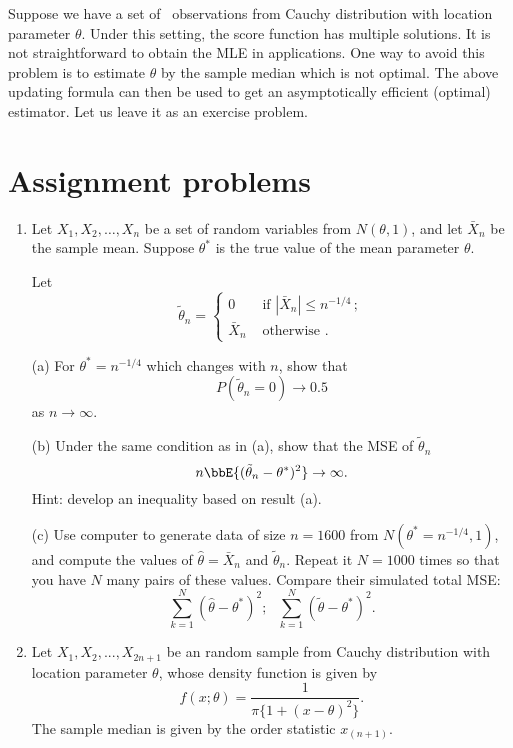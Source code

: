 Suppose we have a set of \iid\ observations from Cauchy distribution
with location parameter $\theta$. Under this setting, the score function
has multiple solutions. It is not straightforward to obtain the MLE in
applications. One way to avoid this problem is to estimate $\theta$ by
the sample median which is not optimal. 
The above updating formula can then be used
to get an asymptotically efficient (optimal) estimator.
Let us leave it as an exercise problem.

\section{Assignment problems}
\begin{enumerate}

\item
Let $ X_{1}, X_{2}, \ldots, X_{n} $ be a set of \iid random
variables from 
$ N( \theta, 1 ) $, and let $ \bar X_{n} $ be the sample mean. 
Suppose $ \theta^{*} $ is the true value of the mean parameter $ \theta $. 

Let 
\[ 
\tilde \theta_{n} = 
\begin{cases} 
0 & \text { if } | \bar X_{n} | \leq n^{ - 1/4 } \, ; \\ 
\bar X_{n} & \text { otherwise }. 
\end{cases} 
\]  

(a)
For $ \theta^{*} = n^{ - 1/4 } $ which changes with $n$, show that
\[
P( \tilde \theta_n = 0 ) \to 0.5
\]
as $n \to \infty$.

(b)
Under the same condition as in (a), show that the MSE of $\tilde \theta_n$
\[
n \bbE\{ (\tilde \theta_n - \theta^*)^2 \}
\to \infty.
\]
Hint: develop an inequality based on result (a).

(c)
Use computer to generate data of size $n=1600$ from $N(\theta^*= n^{-1/4}, 1)$,
and compute the values of $\hat \theta = \bar X_n$ and $\tilde \theta_n$.
Repeat it $N=1000$ times so that you have $N$ many pairs of these values. 
Compare their simulated total MSE:
\[
\sum_{k=1}^N (\hat \theta - \theta^*)^2; ~~~
\sum_{k=1}^N (\tilde \theta - \theta^*)^2.
\]

\item 
Let $ X_{1}, X_{2}, ... , X_{2n+1} $ be an \iid random sample from
Cauchy distribution 
with location parameter $ \theta $, whose density function is given by 
\[ 
f (x; \theta) = \frac { 1 } { \pi \{ 1 + (x - \theta)^{2} \} }.  
\] 
The sample median is given by the order statistic $x_{(n+1)}$.


\end{enumerate}
